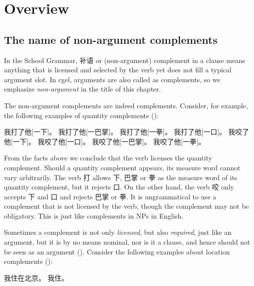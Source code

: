 \documentclass[../main.tex]{subfiles}
\begin{document}

\section{Overview}

\subsection{The name of non-argument complements}\label{sec:complement-name}

In the School Grammar, 补语 or (non-argument) complement in a clause means anything 
that is licensed and selected by the verb 
yet does not fill a typical argument slot. 
In \ac{cgel}, arguments are also called as complements, 
so we emphasize \emph{non-argument} in the title of this chapter. 

The non-argument complements are indeed complements. 
Consider, for example, the following examples 
of quantity complements ():
\begin{exe}
    \ex \begin{xlist}
        \ex 我打了他[一下]。
        \ex 我打了他[一巴掌]。
        \ex 我打了他[一拳]。
        \ex *我打了他[一口]。
        \ex 我咬了他[一下]。
        \ex 我咬了他[一口]。
        \ex *我咬了他[一巴掌]。
        \ex *我咬了他[一拳]。
    \end{xlist}
\end{exe}
From the facts above we conclude that the verb licenses the quantity complement. 
Should a quantity complement appears, its measure word cannot vary arbitrarily. 
The verb 打 allows 下, 巴掌 or 拳 as the measure word of its quantity complement, but it rejects 口. 
On the other hand, the verb 咬 only accepts 下 and 口 and rejects 巴掌 or 拳.
It is ungrammatical to use a complement that is not licensed by the verb, 
though the complement may not be obligatory. 
This is just like complements in NPs in English.

Sometimes a complement is not only \emph{licensed}, but also \emph{required}, just like an argument,
but it is by no means nominal, nor is it a clause, 
and hence should not be seen as an argument (). 
Consider the following examples about location complements ():
\begin{exe}
    \ex \begin{xlist}
        \ex 我住在北京。
        \ex *我住。
    \end{xlist}
\end{exe}
\end{document}
